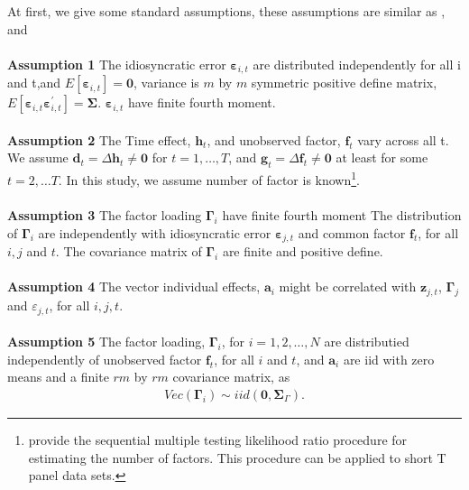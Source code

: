 \documentclass[12pt,a4paper,hyperref]{article}
\begin{document}
At first, we give some standard assumptions, these assumptions are similar as \citet{Hsiao:2002}, \citet{Binder:2005} and \citet{Hayakawa:2018}\\ \\
 \textbf{Assumption 1}  The idiosyncratic error $\boldsymbol{\varepsilon}_{i,t}$ are distributed independently for all i and t,and $E \left[\boldsymbol{\varepsilon}_{i,t}  \right]=\boldsymbol{0}$, variance is $m$ by $m$ symmetric positive define matrix, $E\left[\boldsymbol{\varepsilon}_{i,t} \boldsymbol{\varepsilon}^{'}_{i,t} \right]=\boldsymbol{\Sigma} $.  $\boldsymbol{\varepsilon}_{i,t}$ have finite fourth moment. \\ \\
 \textbf{Assumption 2 }
The Time effect, $\boldsymbol{h}_{t}$, and unobserved factor, $\boldsymbol{f}_{t}$ vary across all t. We assume $\boldsymbol{d}_{t}=\Delta \boldsymbol{h}_{t}\neq \boldsymbol{0}$ for $t=1,\ldots, T$, and $\boldsymbol{g}_{t}=\Delta \boldsymbol{f}_{t}\neq \boldsymbol{0} $ at least for some $t=2, \ldots T$. In this study, we assume number of factor is known\footnote{\citet{Hayakawa:2018} provide the sequential multiple testing likelihood ratio procedure for estimating the number of factors. This procedure can be applied to short T panel data sets.}. \\ \\
 \textbf{Assumption 3 } The factor loading $\boldsymbol{\Gamma}_{i}$ have finite fourth moment
The distribution of $\boldsymbol{\Gamma}_{i}$ are independently with idiosyncratic error $\boldsymbol{\varepsilon}_{j,t}$ and common factor $\boldsymbol{f}_{t}$, for all $i, j$ and $t$.
The covariance matrix of $\boldsymbol{\Gamma}_{i}$ are finite and positive define.  \\ \\
\textbf{Assumption 4}
The vector individual effects, $\boldsymbol{a}_{i}$ might be correlated with $\boldsymbol{z}_{j,t}$, $\boldsymbol{\Gamma}_{j}$ and $\varepsilon_{j,t}$, for all $i, j, t$.
\\ \\
\textbf{Assumption 5}
The factor loading, $\boldsymbol{\Gamma}_{i}$, for $i=1,2,\ldots,N$ are distributied independently of unobserved factor $\boldsymbol{f}_{t}$, for all $i$ and $t$, and $\boldsymbol{a}_{i}$ are iid with zero means and a finite  $rm$ by $rm$  covariance matrix, as
\begin{align}
Vec(\boldsymbol{\Gamma}_{i})\sim iid \left(\boldsymbol{0}, \boldsymbol{\Sigma}_{\Gamma} \right).
\end{align}
\end{document}
